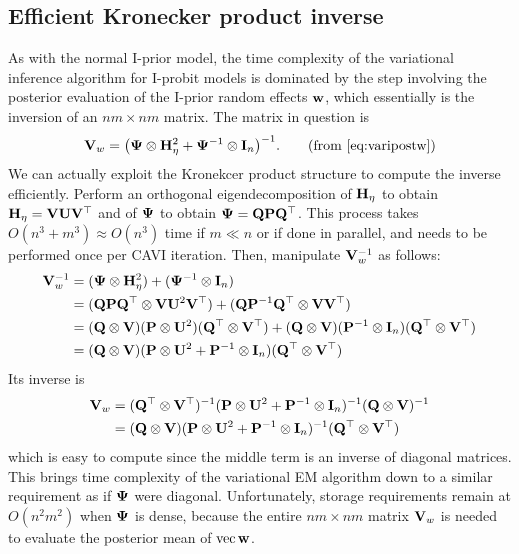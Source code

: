 
\subsection{Efficient Kronecker product inverse}
\label{sec:complxiprobit}

As with the normal I-prior model, the time complexity of the variational inference algorithm for I-probit models is dominated by the step involving the posterior evaluation of the I-prior random effects ${\mathbf w}$, which essentially is the inversion of an $nm \times nm$ matrix.
The matrix in question is %
\begin{align}
  \bV_w = \big( \bPsi \otimes \bH_\eta^2 + \bPsi^{-1} \otimes \bI_n \big)^{-1}. \tag{from \ref{eq:varipostw}}
\end{align}
We can actually exploit the Kronekcer product structure to compute the inverse efficiently.
Perform an orthogonal eigendecomposition of ${\mathbf H}_\eta$ to obtain ${\mathbf H}_\eta = {\mathbf V}{\mathbf U}{\mathbf V}^\top$ and of ${\bm\Psi}$ to obtain ${\bm\Psi} = {\mathbf Q}{\mathbf P}{\mathbf Q}^\top$.
This process takes $O(n^3 + m^3) \approx O(n^3)$ time if $m\ll n$ or if done in parallel, and needs to be performed once per CAVI iteration.
Then, manipulate ${\mathbf V}_w^{-1}$ as follows:
\begin{align*}
  {\mathbf V}_w^{-1} 
  &= ({\bm\Psi} \otimes {\mathbf H}_\eta^2) + ({\bm\Psi}^{-1} \otimes {\mathbf I}_n) \\
  &= ({\mathbf Q}{\mathbf P}{\mathbf Q}^\top \otimes {\mathbf V}{\mathbf U}^2{\mathbf V}^\top) + ({\mathbf Q}{\mathbf P}^{-1}{\mathbf Q}^\top \otimes {\mathbf V}{\mathbf V}^\top) \\
  &= ({\mathbf Q} \otimes {\mathbf V})({\mathbf P} \otimes {\mathbf U}^2)({\mathbf Q}^\top \otimes {\mathbf V}^\top) + 
  ({\mathbf Q} \otimes {\mathbf V})({\mathbf P}^{-1} \otimes {\mathbf I}_n)({\mathbf Q}^\top \otimes {\mathbf V}^\top) \\
  &= ({\mathbf Q} \otimes {\mathbf V})({\mathbf P} \otimes {\mathbf U}^2 + {\mathbf P}^{-1} \otimes {\mathbf I}_n)({\mathbf Q}^\top \otimes {\mathbf V}^\top) 
\end{align*}
Its inverse is 
\begin{align*}
  {\mathbf V}_w 
  &=  ({\mathbf Q}^\top \otimes {\mathbf V}^\top)^{-1}({\mathbf P} \otimes {\mathbf U}^2 + {\mathbf P}^{-1} \otimes {\mathbf I}_n)^{-1} ({\mathbf Q} \otimes {\mathbf V})^{-1} \\
  &= ({\mathbf Q} \otimes {\mathbf V})({\mathbf P} \otimes {\mathbf U}^2 + {\mathbf P}^{-1} \otimes {\mathbf I}_n)^{-1}({\mathbf Q}^\top \otimes {\mathbf V}^\top)
\end{align*}
which is easy to compute since the middle term is an inverse of diagonal matrices.
This brings time complexity of the variational EM algorithm down to a similar requirement as if ${\bm\Psi}$ were diagonal.
Unfortunately, storage requirements remain at $O(n^2m^2)$ when ${\bm\Psi}$ is dense, because the entire $nm \times nm$ matrix ${\mathbf V}_w$ is needed to evaluate the posterior mean of $\operatorname{vec}{\mathbf w}$.

